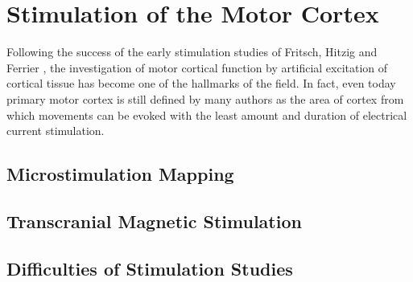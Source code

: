 \section{Stimulation of the Motor Cortex}

Following the success of the early stimulation studies of Fritsch, Hitzig and Ferrier \cite{Fritsch1870,Ferrier1873}, the investigation of motor cortical function by artificial excitation of cortical tissue has become one of the hallmarks of the field. In fact, even today primary motor cortex is still defined by many authors as the area of cortex from which movements can be evoked with the least amount and duration of electrical current stimulation.

\subsection{Microstimulation Mapping}

\subsection{Transcranial Magnetic Stimulation}

\subsection{Difficulties of Stimulation Studies}
